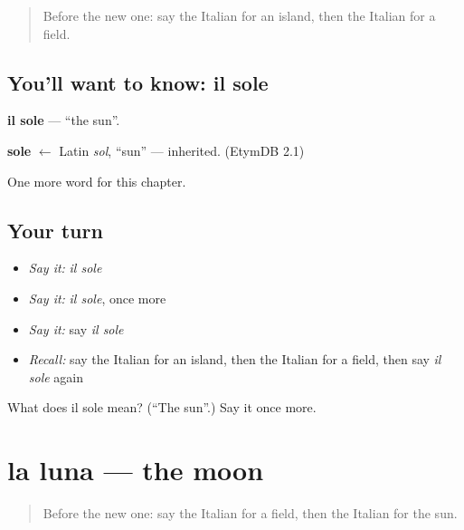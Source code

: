 \label{lesson:IT-C66-sole}



\begin{quote}
Before the new one: say the Italian for an island, then the Italian for a field.
\end{quote}

\subsection*{You'll want to know: il sole}
\textbf{il sole} — \textquotedblleft{}the sun\textquotedblright{}.

\begin{cousinweb}
\textbf{sole} $\leftarrow$ Latin \emph{sol}, \textquotedblleft{}sun\textquotedblright{} — inherited. (EtymDB 2.1)
\end{cousinweb}

\begin{grammarlens}[title={What you've built}]
One more word for this chapter.
\end{grammarlens}

\subsection*{Your turn}
\begin{itemize}
\raggedright
  \item \emph{Say it:} \emph{il sole}
  \item \emph{Say it:} \emph{il sole}, once more
  \item \emph{Say it:} say \emph{il sole}
  \item \emph{Recall:} say the Italian for an island, then the Italian for a field, then say \emph{il sole} again
\end{itemize}

\begin{tcolorbox}[breakable,colback=teal!4,colframe=teal!35!black,title={Before you move on}]
What does il sole mean? (\textquotedblleft{}The sun\textquotedblright{}.) Say it once more.
\end{tcolorbox}
\section[la luna]{la luna — the moon}

\label{lesson:IT-C66-luna}



\begin{quote}
Before the new one: say the Italian for a field, then the Italian for the sun.
\end{quote}

